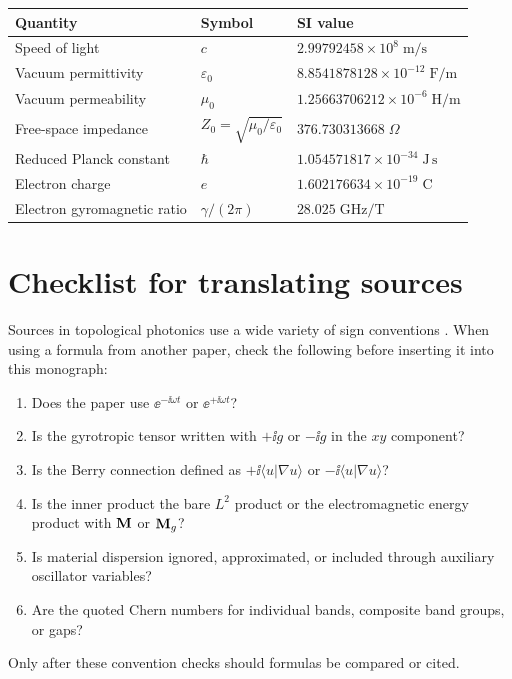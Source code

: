 \begin{center}
\begin{tabular}{lll}
  \toprule
  \textbf{Quantity} & \textbf{Symbol} & \textbf{SI value} \\
  \midrule
  Speed of light & $c$ & $2.99792458\times10^8\;\mathrm{m/s}$ \\
  Vacuum permittivity & $\varepsilon_0$ & $8.8541878128\times10^{-12}\;\mathrm{F/m}$ \\
  Vacuum permeability & $\mu_0$ & $1.25663706212\times10^{-6}\;\mathrm{H/m}$ \\
  Free-space impedance & $Z_0=\sqrt{\mu_0/\varepsilon_0}$ & $376.730313668\;\Omega$ \\
  Reduced Planck constant & $\hbar$ & $1.054571817\times10^{-34}\;\mathrm{J\,s}$ \\
  Electron charge & $e$ & $1.602176634\times10^{-19}\;\mathrm{C}$ \\
  Electron gyromagnetic ratio & $\gamma/(2\pi)$ & $28.025\;\mathrm{GHz/T}$ \\
  \bottomrule
\end{tabular}
\end{center}

\section{Checklist for translating sources}
\label{sec:appD-checklist}

Sources in topological photonics use a wide variety of sign conventions
\cite{ozawa2018topological,gangaraj2016berry}.  When using a formula
from another paper, check the following before
inserting it into this monograph:
\begin{enumerate}
  \item Does the paper use $\ee^{-\ii\omega t}$ or $\ee^{+\ii\omega t}$?
  \item Is the gyrotropic tensor written with $+\ii g$ or $-\ii g$ in
  the $xy$ component?
  \item Is the Berry connection defined as $+\ii\langle u|\nabla u\rangle$
  or $-\ii\langle u|\nabla u\rangle$?
  \item Is the inner product the bare $L^2$ product or the electromagnetic
  energy product with $\mathbf{M}$ or $\mathbf{M}_g$?
  \item Is material dispersion ignored, approximated, or included through
  auxiliary oscillator variables?
  \item Are the quoted Chern numbers for individual bands, composite
  band groups, or gaps?
\end{enumerate}
Only after these convention checks should formulas be compared or cited.


